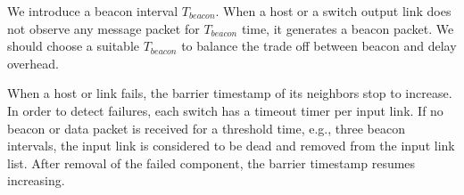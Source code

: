 We introduce a beacon interval $T_{beacon}$. When a host or a switch output link does not observe any message packet for $T_{beacon}$ time, it generates a beacon packet. We should choose a suitable $T_{beacon}$ to balance the trade off between beacon and delay overhead. %

When a host or link fails, the barrier timestamp of its neighbors stop to increase. 
In order to detect failures, each switch has a timeout timer per input link. If no beacon or data packet is received for a threshold time, e.g., three beacon intervals, the input link is considered to be dead and removed from the input link list.
After removal of the failed component, the barrier timestamp resumes increasing.







